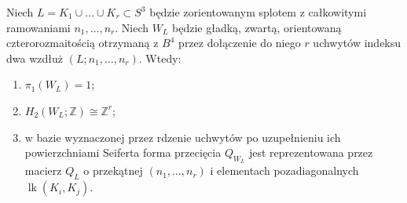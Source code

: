 \begin{twierdzenie}
\label{thm:kt-handle-intersection}
Niech $L=K_1\cup\dots\cup K_r\subset S^3$ będzie
zorientowanym splotem z całkowitymi ramowaniami
$n_1,\dots,n_r$. Niech $W_L$ będzie gładką, zwartą,
orientowaną czterorozmaitością otrzymaną z $B^4$
przez dołączenie do niego $r$ uchwytów indeksu dwa
wzdłuż $(L;n_1,\dots,n_r)$. Wtedy:
\begin{enumerate}[label=(\roman*)]
\item $\pi_1(W_L)=1$;
\item $H_2(W_L;\mathbb Z)\cong\mathbb Z^r$;
\item w bazie wyznaczonej przez rdzenie uchwytów po
uzupełnieniu ich powierzchniami Seiferta forma przecięcia
$Q_{W_L}$ jest reprezentowana przez macierz
$Q_L$ o przekątnej $(n_1,\dots,n_r)$ i elementach
pozadiagonalnych $\operatorname{lk}(K_i,K_j)$.
\end{enumerate}
\end{twierdzenie}

